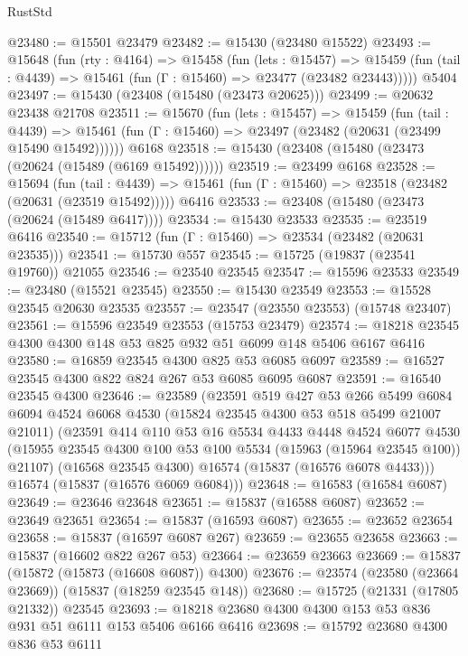 \begin{lexlean}{RustStd}
\begin{coremodule}
{\begin{coremodule}
{{{{{{{{{{{{{{{{{{{{{{{{{{{{{{{{{{{{{{{{{{{{{{{{{{{{{{{{{{{{@23480 := @15501 @23479
@23482 := @15430 (@23480 @15522)
@23493 := @15648
    (fun (rty : @4164) =>
    @15458
      (fun (lets : @15457) =>
      @15459 (fun (tail : @4439) => @15461 (fun (Γ : @15460) => @23477 (@23482 @23443)))))
    @5404
@23497 := @15430 (@23408 (@15480 (@23473 @20625)))
@23499 := @20632 @23438 @21708
@23511 := @15670
    (fun (lets : @15457) =>
    @15459
      (fun (tail : @4439) =>
      @15461 (fun (Γ : @15460) => @23497 (@23482 (@20631 (@23499 @15490 @15492))))))
    @6168
@23518 := @15430 (@23408 (@15480 (@23473 (@20624 (@15489 (@6169 @15492))))))
@23519 := @23499 @6168
@23528 := @15694
    (fun (tail : @4439) => @15461 (fun (Γ : @15460) => @23518 (@23482 (@20631 (@23519 @15492)))))
    @6416
@23533 := @23408 (@15480 (@23473 (@20624 (@15489 @6417))))
@23534 := @15430 @23533
@23535 := @23519 @6416
@23540 := @15712 (fun (Γ : @15460) => @23534 (@23482 (@20631 @23535)))
@23541 := @15730 @557
@23545 := @15725 (@19837 (@23541 @19760)) @21055
@23546 := @23540 @23545
@23547 := @15596 @23533
@23549 := @23480 (@15521 @23545)
@23550 := @15430 @23549
@23553 := @15528 @23545 @20630 @23535
@23557 := @23547 (@23550 @23553) (@15748 @23407)
@23561 := @15596 @23549 @23553 (@15753 @23479)
@23574 := @18218 @23545 @4300 @4300 @148 @53 @825 @932 @51 @6099 @148 @5406 @6167 @6416
@23580 := @16859 @23545 @4300 @825 @53 @6085 @6097
@23589 := @16527 @23545 @4300 @822 @824 @267 @53 @6085 @6095 @6087
@23591 := @16540 @23545 @4300
@23646 := @23589
    (@23591
      @519
      @427
      @53
      @266
      @5499
      @6084
      @6094
      @4524
      @6068
      @4530
      (@15824 @23545 @4300 @53 @518 @5499 @21007 @21011)
      (@23591
        @414
        @110
        @53
        @16
        @5534
        @4433
        @4448
        @4524
        @6077
        @4530
        (@15955 @23545 @4300 @100 @53 @100 @5534 (@15963 (@15964 @23545 @100)) @21107)
        (@16568 @23545 @4300)
        @16574
        (@15837 (@16576 @6078 @4433)))
      @16574
      (@15837 (@16576 @6069 @6084)))
@23648 := @16583 (@16584 @6087)
@23649 := @23646 @23648
@23651 := @15837 (@16588 @6087)
@23652 := @23649 @23651
@23654 := @15837 (@16593 @6087)
@23655 := @23652 @23654
@23658 := @15837 (@16597 @6087 @267)
@23659 := @23655 @23658
@23663 := @15837 (@16602 @822 @267 @53)
@23664 := @23659 @23663
@23669 := @15837 (@15872 (@15873 (@16608 @6087)) @4300)
@23676 := @23574 (@23580 (@23664 @23669)) (@15837 (@18259 @23545 @148))
@23680 := @15725 (@21331 (@17805 @21332)) @23545
@23693 := @18218 @23680 @4300 @4300 @153 @53 @836 @931 @51 @6111 @153 @5406 @6166 @6416
@23698 := @15792 @23680 @4300 @836 @53 @6111
}}}}}}}}}}}}}}}}}}}}}}}}}}}}}}}}}}}}}}}}}}}}}}}}}}}}}}}}}}}}
\end{coremodule}}
\end{coremodule}
\end{lexlean}
